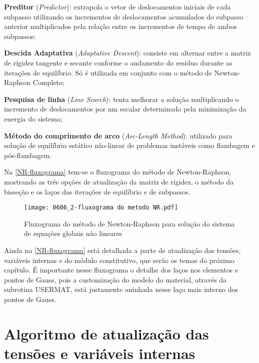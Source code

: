 \begin{alineas}
	\item \textbf{Preditor} (\textit{Predictor}): extrapola o vetor de deslocamentos iniciais de cada subpasso utilizando os incrementos de deslocamentos acumulados do subpasso anterior multiplicados pela relação entre os incrementos de tempo de ambos subpassos;
	
	\item \textbf{Descida Adaptativa} (\textit{Adaptative Descent}): consiste em alternar entre a matriz de rigidez tangente e secante conforme o andamento do resíduo durante as iterações de equilíbrio. Só é utilizada em conjunto com o método de Newton-Raphson Completo;
	
	\item \textbf{Pesquisa de linha} (\textit{Line Search}): tenta melhorar a solução multiplicando o incremento de deslocamentos por um escalar determinado pela minimização da energia do sistema;
	
	\item \textbf{Método do comprimento de arco} (\textit{Arc-Length Method}): utilizado para solução de equilíbrio estático não-linear de problemas instáveis como flambagem e pós-flambagem.	
\end{alineas}

Na \autoref{NR-fluxograma} tem-se o fluxograma do método de Newton-Raphson, mostrando as três opções de atualização da matriz de rigidez, o método da bisseção e os laços das iterações de equilíbrio e de subpassos.
\begin{figure}[H]
	\begin{center}
		\texttt{[image: 0606\_2-fluxograma do metodo NR.pdf]}
	\end{center}
	\caption{\label{NR-fluxograma}Fluxograma do método de Newton-Raphson para solução do sistema de equações globais não lineares}
\end{figure}
Ainda na \autoref{NR-fluxograma} está detalhada a parte de atualização das tensões, variáveis internas e do módulo constitutivo, que serão os temas do próximo capítulo. É importante nesse fluxograma o detalhe dos laços nos elementos e pontos de Gauss, pois a customização do modelo do material, através da subrotina USERMAT, está justamente aninhada nesse laço mais interno dos pontos de Gauss.

\section{Algoritmo de atualização das tensões e variáveis internas}\label{algoritmo de atualização das tensões e variáveis internas}

